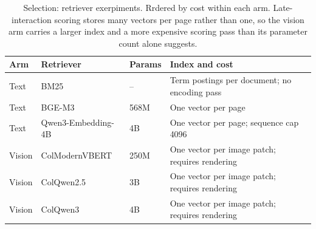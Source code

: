 \begin{table}[h]
\centering
\small
\setlength{\tabcolsep}{4pt}
\renewcommand{\arraystretch}{1.15}
\begin{tabularx}{\linewidth}{@{}
  >{\raggedright\arraybackslash}p{1.4cm}
  >{\raggedright\arraybackslash}p{3.4cm}
  >{\raggedright\arraybackslash}p{1.5cm}
  >{\raggedright\arraybackslash}X@{}}
\toprule
Arm & Retriever & Params & Index and cost \\
\midrule
Text & BM25 & -- & Term postings per document; no encoding pass \\
\midrule
Text & BGE-M3 & 568M & One vector per page \\
\midrule
Text & Qwen3-Embedding-4B & 4B & One vector per page; sequence cap 4096 \\
\midrule
Vision & ColModernVBERT & 250M & One vector per image patch; requires rendering \\
\midrule
Vision & ColQwen2.5 & 3B & One vector per image patch; requires rendering \\
\midrule
Vision & ColQwen3 & 4B & One vector per image patch; requires rendering \\
\bottomrule
\end{tabularx}
\caption{Selection: retriever exerpiments. Rrdered by cost within each arm. Late-interaction scoring stores many vectors per page rather than one, so the vision arm carries a larger index and a more expensive scoring pass than its parameter count alone suggests.}
\label{tab:retrievers}
\end{table}
